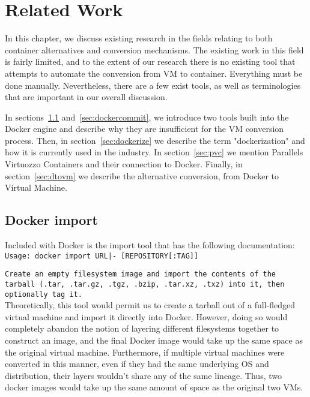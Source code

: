 \chapter{Related Work}
\label{chap:relatedwork}
In this chapter, we discuss existing research in the fields relating to both container alternatives and conversion mechanisms. The existing work in this field is fairly limited, and to the extent of our research there is no existing tool that attempts to automate the conversion from VM to container. Everything must be done manually. Nevertheless, there are a few exist tools, as well as terminologies that are important in our overall discussion.

In sections~\ref{sec:dockerimport} and~\ref{sec:dockercommit}, we introduce two tools built into the Docker engine and describe why they are insufficient for the VM conversion process. Then, in section~\ref{sec:dockerize} we describe the term "dockerization" and how it is currently used in the industry. In section~\ref{sec:pvc} we mention Parallels Virtuozzo Containers and their connection to Docker. Finally, in section~\ref{sec:dtovm} we describe the alternative conversion, from Docker to Virtual Machine.

\section{Docker import}
\label{sec:dockerimport}
Included with Docker is the import tool that has the following documentation:\\

\texttt{Usage: docker import URL|- [REPOSITORY[:TAG]]}

\texttt{Create an empty filesystem image and import the contents of the tarball (.tar, .tar.gz, .tgz, .bzip, .tar.xz, .txz) into it, then optionally tag it.} \\

Theoretically, this tool would permit us to create a tarball out of a full-fledged virtual machine and import it directly into Docker. However, doing so would completely abandon the notion of layering different filesystems together to construct an image, and the final Docker image would take up the same space as the original virtual machine. Furthermore, if multiple virtual machines were converted in this manner, even if they had the same underlying OS and distribution, their layers wouldn't share any of the same lineage. Thus, two docker images would take up the same amount of space as the original two VMs. 

